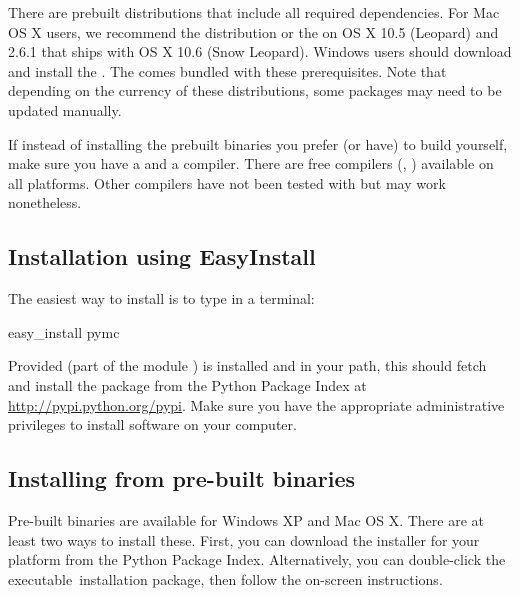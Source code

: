 \documentclass[]{jss}
\begin{document}
There are prebuilt distributions that include all required dependencies. For
Mac OS X users, we recommend the  \citep{macpython} distribution or the
 \citep{epd} on OS X 10.5 (Leopard) and  2.6.1 that
ships with OS X 10.6 (Snow Leopard). Windows users should download and install the
. The  comes
bundled with these prerequisites. Note that depending on the currency of these
distributions, some packages may need to be updated manually.

If instead of installing the prebuilt binaries you prefer (or have) to build
 yourself, make sure you have a  and a  compiler. There are free
compilers (,  \citep{gcc}) available on all platforms. Other compilers have not been
tested with  but may work nonetheless.



\subsection{Installation using EasyInstall}
  \label{installation-using-easyinstall}%


The easiest way to install  is to type in a terminal:
%
\begin{CodeInput}
easy_install pymc
\end{CodeInput}

Provided   (part of the  module \citep{setuptools}) is installed
and in your path, this should fetch and install the package from the
Python Package Index at \href{http://pypi.python.org/pypi}{http://pypi.python.org/pypi}. Make sure you have the appropriate administrative
privileges to install software on your computer.



\subsection{Installing from pre-built binaries}
  \label{installing-from-pre-built-binaries}%


Pre-built binaries are available for Windows XP and Mac OS X. There are at least
two ways to install these. First, you can download the installer for your platform from the Python Package Index. Alternatively, you can double-click the executable~installation package, then follow the
on-screen instructions.
\end{document}
